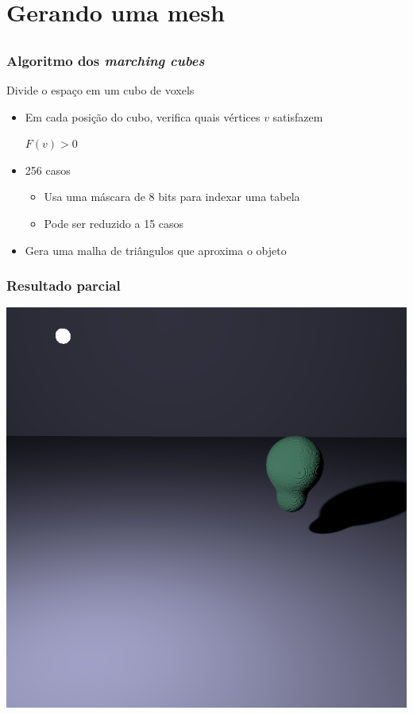 \documentclass[brazil]{beamer}
\begin{document}
  
  \section{Gerando uma mesh}
  
    \subsection{}
    
      \begin{frame}
        \frametitle{Algoritmo dos \textit{marching cubes}}
        Divide o espaço em um cubo de voxels
        \begin{itemize}
          \vspace{1em}
          \item
            Em cada posição do cubo, verifica quais vértices $v$ satisfazem
            \vspace{1em}
            \begin{center}
              $F(v) > 0$
            \end{center}
          \pause
          \vspace{1em}
          \item
            256 casos
            \begin{itemize}
              \item Usa uma máscara de 8 bits para indexar uma tabela
              \item Pode ser reduzido a 15 casos
            \end{itemize}
          \vspace{1em}
          \pause
          \item Gera uma malha de triângulos que aproxima o objeto
        \end{itemize}
      \end{frame}
    
      \begin{frame}
        \frametitle{Resultado parcial}
        \begin{center}
          \includegraphics[width=.6\textwidth]{imgs/metaball-preview.png}
        \end{center}
      \end{frame}
  
\end{document}
